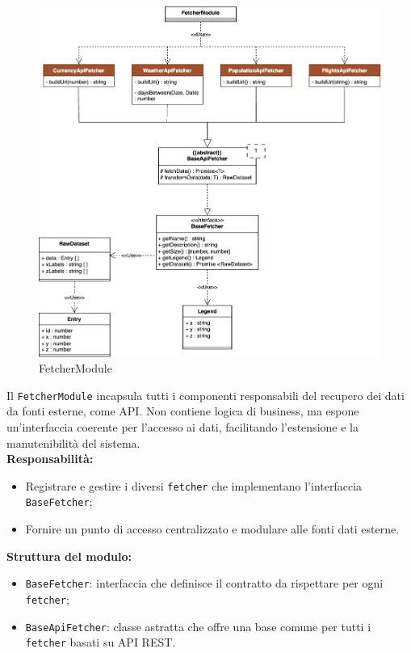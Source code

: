 \begin{figure}[H] 
    \centering
    \includegraphics[scale = 0.4]{template/images/uml_back/FetcherModule.png}
    \caption{FetcherModule}
\end{figure}

Il \texttt{FetcherModule} incapsula tutti i componenti responsabili del recupero dei dati da fonti esterne, come API. Non contiene logica di business, ma espone un'interfaccia coerente per l’accesso ai dati, facilitando l’estensione e la manutenibilità del sistema.\\

\textbf{Responsabilità:}
\begin{itemize}
    \item Registrare e gestire i diversi \texttt{fetcher} che implementano l’interfaccia \texttt{BaseFetcher};
    \item Fornire un punto di accesso centralizzato e modulare alle fonti dati esterne.
\end{itemize}

\textbf{Struttura del modulo:}
\begin{itemize}
    \item \texttt{BaseFetcher}: interfaccia che definisce il contratto da rispettare per ogni \texttt{fetcher};
    \item \texttt{BaseApiFetcher}: classe astratta che offre una base comune per tutti i \texttt{fetcher} basati su API REST.
\end{itemize}

